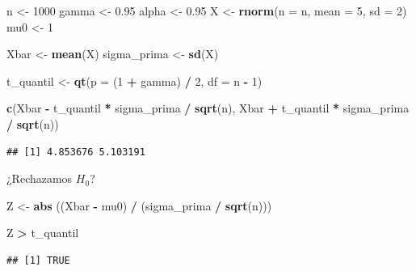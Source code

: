\documentclass[
  12pt,
]{book}
\newenvironment{Shaded}{\begin{snugshade}}{\end{snugshade}}
\newcommand{\DataTypeTok}[1]{\textcolor[rgb]{0.13,0.29,0.53}{#1}}
\newcommand{\DecValTok}[1]{\textcolor[rgb]{0.00,0.00,0.81}{#1}}
\newcommand{\FloatTok}[1]{\textcolor[rgb]{0.00,0.00,0.81}{#1}}
\newcommand{\KeywordTok}[1]{\textcolor[rgb]{0.13,0.29,0.53}{\textbf{#1}}}
\newcommand{\NormalTok}[1]{#1}
\newcommand{\OperatorTok}[1]{\textcolor[rgb]{0.81,0.36,0.00}{\textbf{#1}}}
\newcommand{\StringTok}[1]{\textcolor[rgb]{0.31,0.60,0.02}{#1}}
\begin{document}
\begin{Shaded}
\begin{Highlighting}[]
\NormalTok{n \textless{}{-}}\StringTok{ }\DecValTok{1000}
\NormalTok{gamma \textless{}{-}}\StringTok{ }\FloatTok{0.95}
\NormalTok{alpha \textless{}{-}}\StringTok{ }\FloatTok{0.95}
\NormalTok{X \textless{}{-}}\StringTok{ }\KeywordTok{rnorm}\NormalTok{(}\DataTypeTok{n =}\NormalTok{ n, }\DataTypeTok{mean =} \DecValTok{5}\NormalTok{, }\DataTypeTok{sd =} \DecValTok{2}\NormalTok{)}
\NormalTok{mu0 \textless{}{-}}\StringTok{ }\DecValTok{1}

\NormalTok{Xbar \textless{}{-}}\StringTok{ }\KeywordTok{mean}\NormalTok{(X)}
\NormalTok{sigma\_prima \textless{}{-}}\StringTok{ }\KeywordTok{sd}\NormalTok{(X)}

\NormalTok{t\_quantil \textless{}{-}}\StringTok{ }\KeywordTok{qt}\NormalTok{(}\DataTypeTok{p =}\NormalTok{ (}\DecValTok{1} \OperatorTok{+}\StringTok{ }\NormalTok{gamma) }\OperatorTok{/}\StringTok{ }\DecValTok{2}\NormalTok{, }\DataTypeTok{df =}\NormalTok{ n }\OperatorTok{{-}}\StringTok{ }\DecValTok{1}\NormalTok{)}

\KeywordTok{c}\NormalTok{(Xbar }\OperatorTok{{-}}\StringTok{ }\NormalTok{t\_quantil }\OperatorTok{*}\StringTok{ }\NormalTok{sigma\_prima }\OperatorTok{/}\StringTok{ }\KeywordTok{sqrt}\NormalTok{(n),}
\NormalTok{  Xbar }\OperatorTok{+}\StringTok{ }\NormalTok{t\_quantil }\OperatorTok{*}\StringTok{ }\NormalTok{sigma\_prima }\OperatorTok{/}\StringTok{ }\KeywordTok{sqrt}\NormalTok{(n))}
\end{Highlighting}
\end{Shaded}

\begin{verbatim}
## [1] 4.853676 5.103191
\end{verbatim}

¿Rechazamos \(H_0\)?

\begin{Shaded}
\begin{Highlighting}[]
\NormalTok{Z \textless{}{-}}\StringTok{ }\KeywordTok{abs}\NormalTok{ ((Xbar }\OperatorTok{{-}}\StringTok{ }\NormalTok{mu0) }\OperatorTok{/}\StringTok{ }\NormalTok{(sigma\_prima }\OperatorTok{/}\StringTok{ }\KeywordTok{sqrt}\NormalTok{(n)))}

\NormalTok{Z }\OperatorTok{\textgreater{}}\StringTok{ }\NormalTok{t\_quantil}
\end{Highlighting}
\end{Shaded}

\begin{verbatim}
## [1] TRUE
\end{verbatim}
\end{document}
